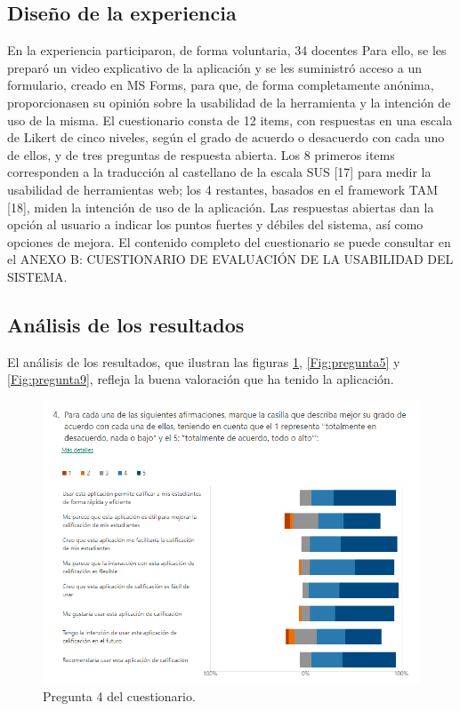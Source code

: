 \subsection{Diseño de la experiencia}

En la experiencia participaron, de forma voluntaria, 34 docentes Para ello, se les preparó un video explicativo de la aplicación y se les suministró acceso a un formulario, creado en MS Forms, para que, de forma completamente anónima, proporcionasen su opinión sobre la usabilidad de la herramienta y la intención de uso de la misma. El cuestionario consta de 12 items, con respuestas en una escala de Likert de cinco niveles, según el grado de acuerdo o desacuerdo con cada uno de ellos, y de tres preguntas de respuesta abierta. Los 8 primeros items corresponden a la traducción al castellano de la escala SUS [17] para medir la usabilidad de herramientas web; los 4 restantes, basados en el framework TAM [18], miden la intención de uso de la aplicación. Las respuestas abiertas dan la opción al usuario a indicar los puntos fuertes y débiles del sistema, así como opciones de mejora. El contenido completo del cuestionario se puede consultar en el ANEXO B: CUESTIONARIO DE EVALUACIÓN DE LA USABILIDAD DEL SISTEMA.

\subsection{Análisis de los resultados}
El análisis de los resultados, que ilustran las figuras \ref{Fig:pregunta4}, \ref{Fig:pregunta5} y \ref{Fig:pregunta9}, refleja la buena valoración que ha tenido la aplicación.

\begin{figure}[h]
\centering\includegraphics[width=1\linewidth]{figs/pregunta4.png}
\caption{Pregunta 4 del cuestionario.}
\label{Fig:pregunta4}
\end{figure}

